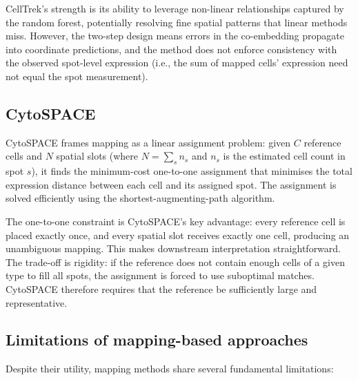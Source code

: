 CellTrek's strength is its ability to leverage non-linear relationships captured by the random forest, potentially resolving fine spatial patterns that linear methods miss. However, the two-step design means errors in the co-embedding propagate into coordinate predictions, and the method does not enforce consistency with the observed spot-level expression (i.e., the sum of mapped cells' expression need not equal the spot measurement).

\subsection{CytoSPACE}

CytoSPACE \citep{vahid2023cytospace} frames mapping as a linear assignment problem: given $C$ reference cells and $N$ spatial slots (where $N = \sum_s n_s$ and $n_s$ is the estimated cell count in spot $s$), it finds the minimum-cost one-to-one assignment that minimises the total expression distance between each cell and its assigned spot. The assignment is solved efficiently using the shortest-augmenting-path algorithm.

The one-to-one constraint is CytoSPACE's key advantage: every reference cell is placed exactly once, and every spatial slot receives exactly one cell, producing an unambiguous mapping. This makes downstream interpretation straightforward. The trade-off is rigidity: if the reference does not contain enough cells of a given type to fill all spots, the assignment is forced to use suboptimal matches. CytoSPACE therefore requires that the reference be sufficiently large and representative.

\subsection{Limitations of mapping-based approaches}

Despite their utility, mapping methods share several fundamental limitations:

